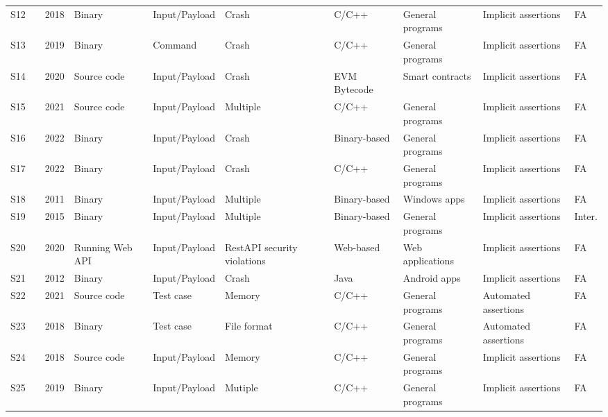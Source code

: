 \begin{table}[t]
{\begin{tabular}{|lp{0.5cm}p{0.5cm}lllllll|}
\midrule

S12 & \cite{Liu2018}  &  2018  & Binary &  Input/Payload  &   Crash  &  C/C++   &  General programs  &  Implicit assertions  &   FA   \\
S13 & \cite{Bohme2019489}  &  2019  & Binary &  Command  &   Crash  &  C/C++   &  General programs  &  Implicit assertions  &   FA   \\
S14 & \cite{Wuestholz20201398}  &  2020  & Source code &  Input/Payload  &   Crash  &  EVM Bytecode   &  Smart contracts  &  Implicit assertions  &   FA   \\
S15 & \cite{Alshmrany202185}  &  2021  & Source code &  Input/Payload  &   Multiple  &  C/C++   &  General programs  &  Implicit assertions  &   FA   \\
S16 & \cite{Gong2022374}  &  2022  & Binary &  Input/Payload  &   Crash  &  Binary-based   &  General programs  &  Implicit assertions  &   FA   \\
S17 & \cite{Yu2022}  &  2022  & Binary &  Input/Payload  &   Crash  &  C/C++  &  General programs  &  Implicit assertions  &   FA   \\
S18 & \cite{wu2011fuzzing}  &  2011  & Binary &  Input/Payload  &   Multiple  &  Binary-based   &  Windows apps  &  Implicit assertions  &   FA   \\
S19 & \cite{Kargen2015782}  &  2015  & Binary &  Input/Payload  &   Multiple  &  Binary-based  &  General programs  &  Implicit assertions  &   Inter.   \\
S20 & \cite{Atlidakis2020387}  &  2020  & Running Web API &  Input/Payload  &   RestAPI security violations  &  Web-based   &  Web applications  &  Implicit assertions  &   FA   \\
S21 & \cite{mahmood2012whitebox}  &  2012  & Binary &  Input/Payload  &   Crash  &  Java  &  Android apps  &  Implicit assertions  &   FA   \\
S22 & \cite{KallingalJoshy2021540}  &  2021  & Source code &  Test case  &   Memory  &  C/C++  &  General programs  &  Automated assertions  &   FA   \\
S23 & \cite{Ren2018391}  &  2018  & Binary &  Test case  &   File format &  C/C++  &  General programs  &  Automated assertions  &   FA   \\
S24 & \cite{shoshitaishvili2018mechanical}  &  2018  & Source code &  Input/Payload  &   Memory &  C/C++  &  General programs  &  Implicit assertions  &   FA   \\
S25 & \cite{Zhang201946}  &  2019  & Binary &   Input/Payload  &   Mutiple &  C/C++  &  General programs  &  Implicit assertions  &   FA   \\


\end{tabular}}
\end{table}
